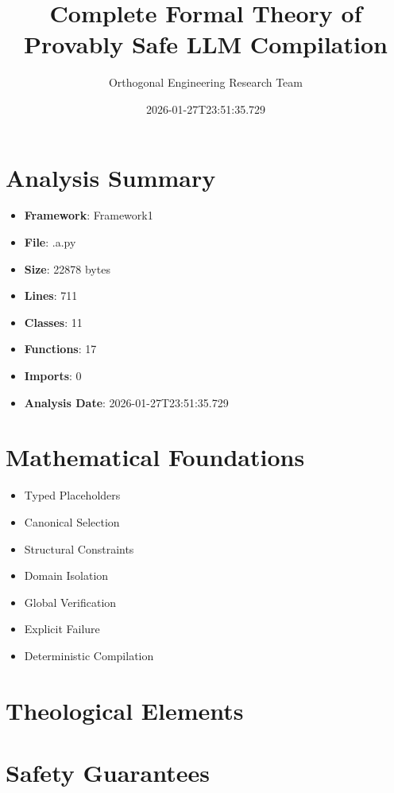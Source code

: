 ﻿\documentclass[12pt]{article}
\title{Complete Formal Theory of Provably Safe LLM Compilation}
\author{Orthogonal Engineering Research Team}
\date{2026-01-27T23:51:35.729}
\begin{document}
\maketitle

\section{Analysis Summary}

\begin{itemize}
    \item \textbf{Framework}: Framework1
    \item \textbf{File}: .\1a.py
    \item \textbf{Size}: 22878 bytes
    \item \textbf{Lines}: 711
    \item \textbf{Classes}: 11
    \item \textbf{Functions}: 17
    \item \textbf{Imports}: 0
    \item \textbf{Analysis Date}: 2026-01-27T23:51:35.729
\end{itemize}

\section{Mathematical Foundations}

\begin{itemize}    \item Typed Placeholders
    \item Canonical Selection
    \item Structural Constraints
    \item Domain Isolation
    \item Global Verification
    \item Explicit Failure
    \item Deterministic Compilation
\end{itemize}

\section{Theological Elements}

\begin{itemize}\end{itemize}

\section{Safety Guarantees}
\end{document}
